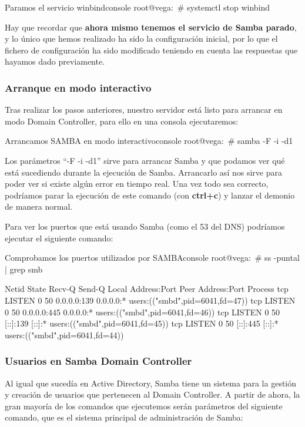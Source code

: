 \begin{mycode}{Paramos el servicio winbind}{console}{}
root@vega:~# systemctl stop winbind
\end{mycode}

Hay que recordar que \textbf{ahora mismo tenemos el servicio de Samba parado}, y lo único que hemos realizado ha sido la configuración inicial, por lo que el fichero de configuración    ha sido modificado teniendo en cuenta las respuestas que hayamos dado previamente.

\subsubsection{Arranque en modo interactivo}
Tras realizar los pasos anteriores, nuestro servidor está listo para arrancar en modo Domain Controller, para ello en una consola ejecutaremos:

\begin{mycode}{Arrancamos SAMBA en modo interactivo}{console}{}
root@vega:~# samba -F -i -d1
\end{mycode}

Los parámetros “-F -i -d1” sirve para arrancar Samba y que podamos ver qué está sucediendo durante la ejecución de Samba. Arrancarlo así nos sirve para poder ver si existe algún error en tiempo real. Una vez todo sea correcto, podríamos parar la ejecución de este comando (con \textbf{ctrl+c}) y lanzar el demonio de manera normal.

Para ver los puertos que está usando Samba (como el 53 del DNS) podríamos ejecutar el siguiente comando:

\begin{mycode}{Comprobamos los puertos utilizados por SAMBA}{console}{\fontsize{7.6pt}{7pt}}
root@vega:~# ss -puntal | grep smb

Netid  State   Recv-Q  Send-Q    Local Address:Port    Peer Address:Port  Process
tcp    LISTEN  0       50        0.0.0.0:139          0.0.0.0:*      users:(("smbd",pid=6041,fd=47))
tcp    LISTEN  0       50        0.0.0.0:445          0.0.0.0:*      users:(("smbd",pid=6041,fd=46))
tcp    LISTEN  0       50        [::]:139             [::]:*          users:(("smbd",pid=6041,fd=45))
tcp    LISTEN  0       50        [::]:445             [::]:*          users:(("smbd",pid=6041,fd=44))
\end{mycode}

\subsubsection{Usuarios en Samba Domain Controller}
Al igual que sucedía en Active Directory, Samba tiene un sistema para la gestión y creación de usuarios que pertenecen al Domain Controller. A partir de ahora, la gran mayoría de los comandos que ejecutemos serán parámetros del siguiente comando, que es el sistema principal de administración de Samba:


